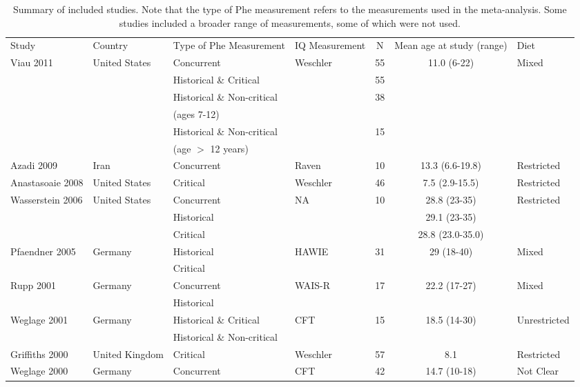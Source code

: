 \documentclass{svjour3}                     %
\begin{document}
\begin{table}

    \caption{Summary of included studies. Note that the type of Phe measurement refers to the measurements used in the meta-analysis. Some studies included a broader range of measurements, some of which were not used.} \label{tab:studies}

    \begin{tabular}{llllccl}
    \hline\noalign{\smallskip}
    Study & Country & Type of Phe Measurement & IQ Measurement & N & Mean age at study (range) & Diet\\
    \noalign{\smallskip}\hline\noalign{\smallskip}
    Viau 2011 & United States & Concurrent & Weschler & 55 & 11.0 (6-22) & Mixed\\
    & & Historical \& Critical & & 55 & &\\
    & & Historical \& Non-critical & & 38 & &\\
    & & (ages 7-12) & & & & \\
    & & Historical \& Non-critical & & 15 & &\\
    & & (age $>$ 12 years) & & & & \\
    Azadi 2009 & Iran & Concurrent & Raven & 10 & 13.3 (6.6-19.8) & Restricted\\
    Anastasoaie 2008 & United States & Critical & Weschler & 46 & 7.5 (2.9-15.5) & Restricted\\
    Wasserstein 2006 & United States & Concurrent & NA & 10 & 28.8 (23-35) & Restricted\\
    & & Historical & & & 29.1 (23-35) & \\
    & & Critical & & & 28.8 (23.0-35.0) & \\
    Pfaendner 2005 & Germany & Historical & HAWIE & 31 & 29 (18-40) & Mixed\\
    & & Critical &  &  & \\
    Rupp 2001 & Germany & Concurrent & WAIS-R & 17 & 22.2 (17-27) & Mixed\\
    & & Historical &  &  & \\
    Weglage 2001 & Germany & Historical \& Critical & CFT & 15 & 18.5 (14-30) & Unrestricted\\
    & & Historical \& Non-critical & & & & \\
    Griffiths 2000 & United Kingdom & Critical & Weschler & 57 & 8.1 & Restricted\\
    Weglage 2000 & Germany & Concurrent & CFT & 42 & 14.7 (10-18) & Not Clear\\

\end{tabular}
\end{table}
\end{document}
